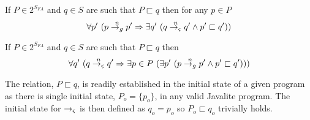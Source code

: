 \begin{corollary}
If $P \in 2^{S_\mathit{FA}}$ and $q \in S$ are such that $P \sqsubset q$ then for any $p \in P$
$$
\forall p^\prime\ (p \stackrel{n}{\rightarrow_{g}} p^\prime \Rightarrow \exists q^\prime\ (q \stackrel{n}{\rightarrow_{\varsigma}} q^\prime \wedge p^\prime \sqsubset q^\prime))
$$
\end{corollary}

\begin{corollary}
If $P \in 2^{S_\mathit{FA}}$ and $q \in S$ are such that $P \sqsubset q$ then
$$
\forall q^\prime\ (q \stackrel{n}{\rightarrow_{\varsigma}} q^\prime \Rightarrow \exists p \in P\ (\exists p^\prime\ (p \stackrel{n}{\rightarrow_{g}} p^\prime \wedge p^\prime \sqsubset q^\prime)))
$$
\end{corollary}

The relation, $P \sqsubset q$, is readily established in the initial
state of a given program as there is single initial state, $P_o =
\{p_o\}$, in any valid Javalite program. The initial state for $\rightarrow_{\varsigma}$ is
then defined as $q_o = p_o$ so $P_o \sqsubset q_o$ trivially holds.
